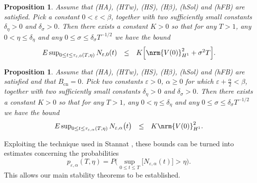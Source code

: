 \documentclass[10pt]{articleHJ}
\newcommand{\e}{\ensuremath{\varepsilon}}
\renewcommand{\a}{\ensuremath{\alpha}}
\DeclarePairedDelimiter{\nrm}\lVert\rVert
\newtheorem{prop}[thm]{Proposition}
\numberwithin{equation}{section}
\begin{document}
\begin{prop}
\label{prp:nls:general}
Assume that (HA), (HTw), (HS), (H$\beta$),
(hSol) and (hFB) are satisfied.
Pick a constant $0 < \e < \beta$,
together with two sufficiently small
constants $\delta_{\eta} > 0$
and $\delta_{\sigma} > 0$.
Then there exists a constant
$K > 0$ so that for any $T > 1$,
any $0 < \eta \le \delta_{\eta}$
and any $0 \le \sigma \le \delta_{\sigma}  T^{-1/2}$
we have the bound
\begin{equation}
\label{eq:nls:prp:general:estimate}
\begin{array}{lcl}
E \sup_{0 \le t \le \tau_{\e,0}(T, \eta) } N_{\e,0} (t)
&\leq &
   K \Big[ %
     \nrm{V(0)}^2_{H^1}+ \sigma^2 T \Big] .
\end{array}
\end{equation}
\end{prop}


\begin{prop}
\label{prp:nls:exponential}
Assume that (HA), (HTw), (HS), (H$\beta$),
(hSol) and (hFB) are satisfied
and that $B_{\mathrm{cn}} = 0$.
Pick two constants $\e > 0$,
$\alpha \ge 0$ for which $\e + \frac{\alpha}{2} < \beta$,
together with two sufficiently small
constants $\delta_{\eta} > 0$
and $\delta_{\sigma} > 0$.
Then there exists a constant
$K > 0$ so that for any $T > 1$,
any $0 < \eta \le \delta_{\eta}$
and any $0 \le \sigma \le \delta_{\sigma} T^{-1/2}$
we have the bound
\begin{equation}
\label{eq:nls:prp:exponential:estimate}
\begin{array}{lcl}
E \sup_{0 \le t \le \tau_{\e,\a}(T,\eta) }
   N_{\e,\alpha}\big(  t\big)
&\leq &
   K %
   \nrm{V(0)}^2_{H^1} .
\end{array}
\end{equation}
\end{prop}

Exploiting the technique used in
Stannat \cite{Stannat},
these bounds can be turned into estimates
concerning the probabilities
\begin{equation}
p_{\e,\alpha}(T,\eta) = P\Big(
 \sup_{0 \leq t \leq T} \big[N_{\e,\a}(t)\big]
 > \eta
\Big).
\end{equation}
This allows our
main stability theorems to be established.
\end{document}
